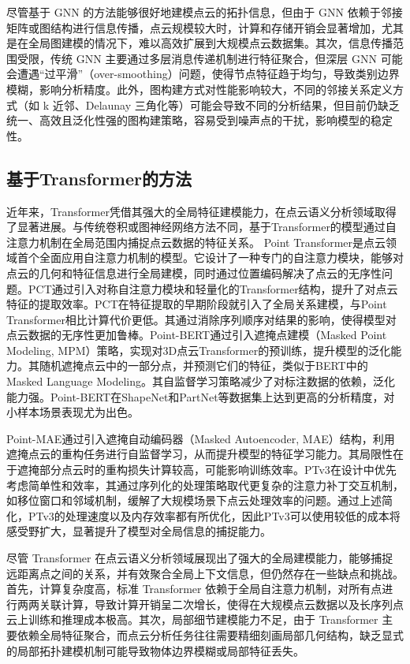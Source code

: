 \documentclass[preprint,12pt]{elsarticle}
\begin{document}
尽管基于 GNN 的方法能够很好地建模点云的拓扑信息，但由于 GNN 依赖于邻接矩阵或图结构进行信息传播，点云规模较大时，计算和存储开销会显著增加，尤其是在全局图建模的情况下，难以高效扩展到大规模点云数据集。其次，信息传播范围受限，传统 GNN 主要通过多层消息传递机制进行特征聚合，但深层 GNN 可能会遭遇“过平滑”（over-smoothing）问题，使得节点特征趋于均匀，导致类别边界模糊，影响分析精度。此外，图构建方式对性能影响较大，不同的邻接关系定义方式（如 k 近邻、Delaunay 三角化等）可能会导致不同的分析结果，但目前仍缺乏统一、高效且泛化性强的图构建策略，容易受到噪声点的干扰，影响模型的稳定性。

\subsection{基于Transformer的方法}
近年来，Transformer凭借其强大的全局特征建模能力，在点云语义分析领域取得了显著进展。与传统卷积或图神经网络方法不同，基于Transformer的模型通过自注意力机制在全局范围内捕捉点云数据的特征关系。
Point Transformer\cite{pt}是点云领域首个全面应用自注意力机制的模型。它设计了一种专门的自注意力模块，能够对点云的几何和特征信息进行全局建模，同时通过位置编码解决了点云的无序性问题。PCT\cite{PCT}通过引入对称自注意力模块和轻量化的Transformer结构，提升了对点云特征的提取效率。PCT在特征提取的早期阶段就引入了全局关系建模，与Point Transformer相比计算代价更低。其通过消除序列顺序对结果的影响，使得模型对点云数据的无序性更加鲁棒。Point-BERT\cite{Point-BERT}通过引入遮掩点建模（Masked Point Modeling, MPM）策略，实现对3D点云Transformer的预训练，提升模型的泛化能力。其随机遮掩点云中的一部分点，并预测它们的特征，类似于BERT中的Masked Language Modeling。其自监督学习策略减少了对标注数据的依赖，泛化能力强。Point-BERT在ShapeNet和PartNet等数据集上达到更高的分析精度，对小样本场景表现尤为出色。

Point-MAE\cite{pointmae}通过引入遮掩自动编码器（Masked Autoencoder, MAE）结构，利用遮掩点云的重构任务进行自监督学习，从而提升模型的特征学习能力。其局限性在于遮掩部分点云时的重构损失计算较高，可能影响训练效率。PTv3\cite{ptv3}在设计中优先考虑简单性和效率，其通过序列化的处理策略取代更复杂的注意力补丁交互机制，如移位窗口和邻域机制，缓解了大规模场景下点云处理效率的问题。通过上述简化，PTv3的处理速度以及内存效率都有所优化，因此PTv3可以使用较低的成本将感受野扩大，显著提升了模型对全局信息的捕捉能力。

尽管 Transformer 在点云语义分析领域展现出了强大的全局建模能力，能够捕捉远距离点之间的关系，并有效聚合全局上下文信息，但仍然存在一些缺点和挑战。首先，计算复杂度高，标准 Transformer 依赖于全局自注意力机制，对所有点进行两两关联计算，导致计算开销呈二次增长，使得在大规模点云数据以及长序列点云上训练和推理成本极高。其次，局部细节建模能力不足，由于 Transformer 主要依赖全局特征聚合，而点云分析任务往往需要精细刻画局部几何结构，缺乏显式的局部拓扑建模机制可能导致物体边界模糊或局部特征丢失。
\end{document}
